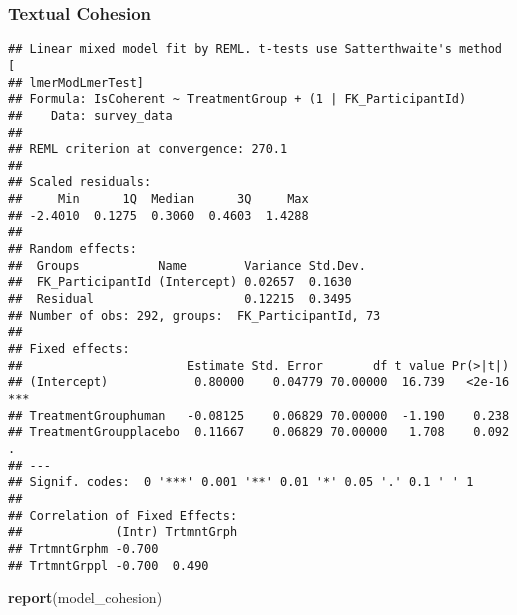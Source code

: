 \documentclass[
]{article}
\newenvironment{Shaded}{\begin{snugshade}}{\end{snugshade}}
\newcommand{\AttributeTok}[1]{\textcolor[rgb]{0.13,0.29,0.53}{#1}}
\newcommand{\DecValTok}[1]{\textcolor[rgb]{0.00,0.00,0.81}{#1}}
\newcommand{\FunctionTok}[1]{\textcolor[rgb]{0.13,0.29,0.53}{\textbf{#1}}}
\newcommand{\NormalTok}[1]{#1}
\newcommand{\OtherTok}[1]{\textcolor[rgb]{0.56,0.35,0.01}{#1}}
\newcommand{\SpecialCharTok}[1]{\textcolor[rgb]{0.81,0.36,0.00}{\textbf{#1}}}
\begin{document}
\subsubsection{Textual Cohesion}\label{textual-cohesion}

\begin{Shaded}
\end{Shaded}

\begin{verbatim}
## Linear mixed model fit by REML. t-tests use Satterthwaite's method [
## lmerModLmerTest]
## Formula: IsCoherent ~ TreatmentGroup + (1 | FK_ParticipantId)
##    Data: survey_data
## 
## REML criterion at convergence: 270.1
## 
## Scaled residuals: 
##     Min      1Q  Median      3Q     Max 
## -2.4010  0.1275  0.3060  0.4603  1.4288 
## 
## Random effects:
##  Groups           Name        Variance Std.Dev.
##  FK_ParticipantId (Intercept) 0.02657  0.1630  
##  Residual                     0.12215  0.3495  
## Number of obs: 292, groups:  FK_ParticipantId, 73
## 
## Fixed effects:
##                       Estimate Std. Error       df t value Pr(>|t|)    
## (Intercept)            0.80000    0.04779 70.00000  16.739   <2e-16 ***
## TreatmentGrouphuman   -0.08125    0.06829 70.00000  -1.190    0.238    
## TreatmentGroupplacebo  0.11667    0.06829 70.00000   1.708    0.092 .  
## ---
## Signif. codes:  0 '***' 0.001 '**' 0.01 '*' 0.05 '.' 0.1 ' ' 1
## 
## Correlation of Fixed Effects:
##             (Intr) TrtmntGrph
## TrtmntGrphm -0.700           
## TrtmntGrppl -0.700  0.490
\end{verbatim}

\begin{Shaded}
\begin{Highlighting}[]
\FunctionTok{report}\NormalTok{(model\_cohesion)}
\end{Highlighting}
\end{Shaded}
\end{document}
